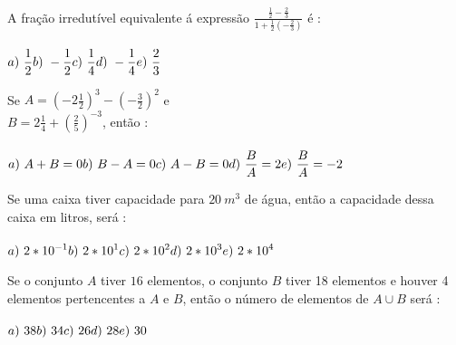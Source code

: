 %

\begin{quest}
 	A fra\c{c}\~ao irredut\'ivel equivalente \'a express\~ao \(\displaystyle \frac{\frac{1}{2}-\frac{2}{3}}{1+\frac{1}{2}(-\frac{2}{3})}\) \'e : \\ \\
	\(\displaystyle a)\ \frac{1}{2} \hfill b)\ -\frac{1}{2} \hfill c)\ \frac{1}{4} \hfill d)\ -\frac{1}{4} \hfill e)\ \frac{2}{3} \)
\end{quest}

\hline
\vfill

\begin{quest}
	Se \(\displaystyle A = (-2\frac{1}{2})^3 - (-\frac{3}{2})^2\) e \\ \(\displaystyle B = 2\frac{1}{4}+(\frac{2}{5})^{-3}\), ent\~ao : \\ \\
	\(\displaystyle a)\ A + B = 0 \hfill b)\ B - A = 0 \hfill c)\ A - B = 0 \hfill \\ d)\ \frac{B}{A} = 2 \hfill e)\ \frac{B}{A} = -2 \)
\end{quest}

\hline
\vfill

\begin{quest}
	Se uma caixa tiver capacidade para $20\ m^3$ de \'agua, ent\~ao a capacidade dessa caixa em litros, ser\'a : \\ \\
	\(\displaystyle a)\ 2*10^{-1} \hfill b)\ 2*10^{1} \hfill c)\ 2*10^{2} \hfill \\ d)\ 2*10^{3} \hfill e)\ 2*10^{4} \)
\end{quest}

\hline
\vfill

\begin{quest}
	Se o conjunto $A$ tiver $16$ elementos, o conjunto $B$ tiver 18 elementos e houver 4 elementos pertencentes a $A$ e $B$, ent\~ao o n\'umero de elementos de $A \cup B$ ser\'a : \\ \\
	\(\displaystyle a)\ 38 \hfill b)\ 34 \hfill c)\ 26 \hfill d)\ 28 \hfill e)\ 30 \)
\end{quest}

